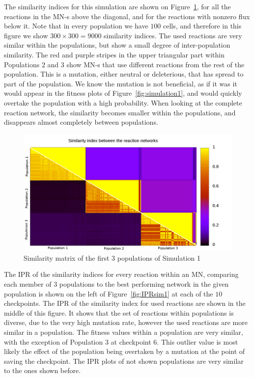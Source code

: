 \documentclass[a4paper,12pt]{article}
\begin{document}
The similarity indices for this simulation are shown on Figure~\ref{fig:simmatrix_firstjob}, for all the reactions in the MN-s above the diagonal, and for the reactions with nonzero flux below it. Note that in every population we have $100$ cells, and therefore in this figure we show $300 \times 300 = 9000$ similarity indices. The used reactions are very similar within the populations, but show a small degree of inter-population similarity. The red and purple stripes in the upper triangular part within Populations $2$ and $3$ show MN-s that use different reactions from the rest of the population. This is a mutation, either neutral or deleterious, that has spread to part of the population. We know the mutation is not beneficial, as if it was it would appear in the fitness plots of Figure~\ref{fig:simulation1}, and would quickly overtake the population with a high probability. When looking at the complete reaction network, the similarity becomes smaller within the populations, and disappears almost completely between populations. 

\begin{figure}[htpb]
	\centering
	\includegraphics[width=1\linewidth]{simmatrix_firstjob.png}
	\caption{Similarity matrix of the first 3 populations of Simulation 1}
	\label{fig:simmatrix_firstjob}
\end{figure}

The IPR of the similarity indices for every reaction within an MN, comparing each member of $3$ populations to the best performing network in the given population is shown on the left of Figure~\ref{fig:IPRsim1} at each of the $10$ checkpoints. The IPR of the similarity index for used reactions are shown in the middle of this figure. It shows that the set of reactions within populations is diverse, due to the very high mutation rate, however the used reactions are more similar in a population. The fitness values within a population are very similar, with the exception of Population $3$ at checkpoint $6$. This outlier value is most likely the effect of the population being overtaken by a mutation at the point of saving the checkpoint. The IPR plots of not shown populations are very similar to the ones shown before. 
\end{document}

